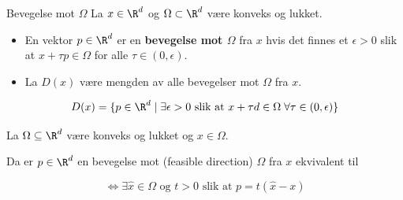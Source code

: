 \begin{definition}{Bevegelse mot \(\Omega\)}{}
	La \(x \in \R^d\) og \(\Omega \subset \R^d\) være konveks og lukket.
	\begin{itemize}
		\item En vektor \(p \in \R^d\) er en \textbf{bevegelse mot \(\Omega\)} fra \(x\) hvis det finnes et \(\epsilon > 0\) slik at \(x + \tau p \in \Omega\) for alle \(\tau \in (0, \epsilon)\).
		\item La \(D(x)\) være mengden av alle bevegelser mot \(\Omega\) fra \(x\).
	\end{itemize}

	\[
		D(x) = \{p \in \R^d \mid \exists \epsilon > 0 \text{ slik at } x + \tau d \in \Omega \; \forall \tau \in (0, \epsilon)\}
	\]

\end{definition}

\begin{lemma}{}{}
	La \(\Omega \subseteq \R^d\) være konveks og lukket og \(x \in \Omega\).

	Da er \(p \in \R^d\) en bevegelse mot (feasible direction) \(\Omega\) fra \(x\) ekvivalent til

	\[
		\Leftrightarrow \exists \hat{x} \in \Omega \text{ og } t > 0 \text{ slik at } p = t(\hat{x} - x)
	\]

\end{lemma}

